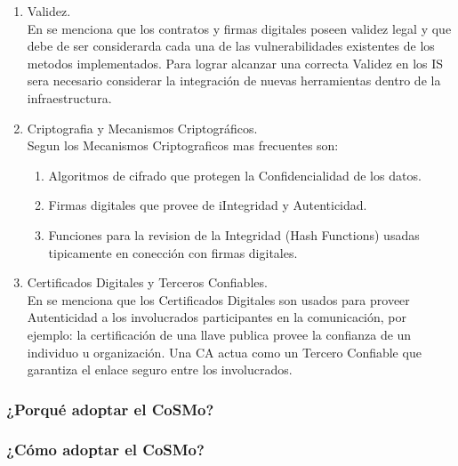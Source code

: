 \documentclass[runningheads,a4paper]{llncs}
\begin{document}
\begin{enumerate}
	\item Validez.\\
	
En \cite{CoSMoIntroduction} se menciona que los contratos y firmas digitales poseen validez legal y que debe de ser considerarda cada una de las vulnerabilidades existentes de los metodos implementados. Para lograr alcanzar una correcta Validez en los \gls{IS} sera necesario considerar la integración de nuevas herramientas dentro de la infraestructura.\\

	\item \gls{Criptografia} y Mecanismos Criptográficos.\\

Segun \cite{CoSMoIntroduction} los Mecanismos Criptograficos mas frecuentes son:

	\begin{enumerate}
		\item Algoritmos de cifrado que protegen la Confidencialidad de los datos.
		\item Firmas digitales que provee de iIntegridad y Autenticidad.
		\item Funciones para la revision de la Integridad (\gls{Hash Functions}) usadas tipicamente en conección con firmas digitales.\\
	\end{enumerate}

	\item Certificados Digitales y Terceros Confiables.\\
	
En \cite{CoSMoIntroduction} se menciona que los Certificados Digitales son usados para proveer Autenticidad a los involucrados participantes en la comunicación, por ejemplo: la certificación de una llave publica provee la confianza de un individuo u organización. Una \gls{CA} actua como un Tercero Confiable que garantiza el enlace seguro entre los involucrados.

	


	
\end{enumerate}

\subsubsection{¿Porqué adoptar el \gls{CoSMo}?}

\subsubsection{¿Cómo adoptar el \gls{CoSMo}?}
\end{document}
